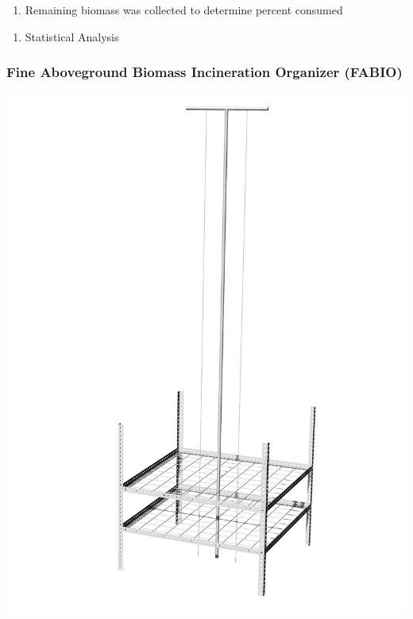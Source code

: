 \documentclass[11pt,a4paper]{article}
\begin{document}
\begin{enumerate}
\def\labelenumi{\alph{enumi}.}
\setcounter{enumi}{4}
\tightlist
\item
  Remaining biomass was collected to determine percent consumed
\end{enumerate}

\begin{enumerate}
\def\labelenumi{\arabic{enumi}.}
\setcounter{enumi}{4}
\tightlist
\item
  Statistical Analysis
\end{enumerate}

\hypertarget{fine-aboveground-biomass-incineration-organizer-fabio}{%
\subsubsection{Fine Aboveground Biomass Incineration Organizer
(FABIO)}\label{fine-aboveground-biomass-incineration-organizer-fabio}}

\includegraphics{figures/FABIOdraft.jpg}
\end{document}
